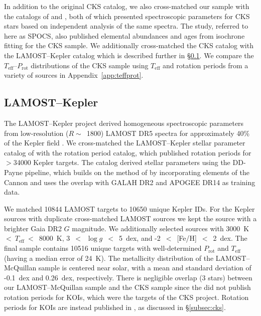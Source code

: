 \documentclass[linenumbers,tighten,trackchanges,twocolumn]{aastex631}
\newcommand{\teff}{\ensuremath{T_{\mathrm{eff}}}\xspace}
\newcommand{\logg}{\ensuremath{\log g}\xspace}
\newcommand{\prot}{\ensuremath{P_\mathrm{rot}}\xspace}
\begin{document}
In addition to the original CKS catalog, we also cross-matched our sample with the catalogs of \citet{Brewer2018} and \citet{Martinez2019}, both of which presented spectroscopic parameters for CKS stars based on independent analysis of the same spectra. The \citet{Brewer2018} study, referred to here as SPOCS, also published elemental abundances and ages from isochrone fitting for the CKS sample. We additionally cross-matched the CKS catalog with the LAMOST--Kepler catalog \citep{Xiang2019} which is described further in \S\ref{subsec:lamost}. We compare the \teff--\prot distributions of the CKS sample using \teff and rotation periods from a variety of sources in Appendix~\ref{app:teffprot}.

\subsection{LAMOST--Kepler} \label{subsec:lamost}
The LAMOST--Kepler project derived homogeneous spectroscopic parameters from low-resolution ($R\sim$~1800) LAMOST DR5 spectra for approximately 40\% of the Kepler field \citep{Zong2018, Xiang2019}. We cross-matched the LAMOST--Kepler stellar parameter catalog of \citet{Xiang2019} with the \citet{McQuillan2014} rotation period catalog, which published rotation periods for $>$34000 Kepler targets. The \citet{Xiang2019} catalog derived stellar parameters using the DD-Payne pipeline, which builds on the method of \citet{Ting2017b} by incorporating elements of the Cannon \citep{Ness2015} and uses the overlap with GALAH DR2 and APOGEE DR14 as training data. 

We matched 10844 LAMOST targets to 10650 unique Kepler IDs. For the Kepler sources with duplicate cross-matched LAMOST sources we kept the source with a brighter Gaia DR2 $G$ magnitude. We additionally selected sources with 3000~K~$<~\teff~<$~8000~K, 3~$<$~\logg~$<$~5~dex, and -2~$<$~[Fe/H]~$<$~2~dex. The final sample contains 10516 unique targets with well-determined \prot and \teff (having a median error of 24~K). The metallicity distribution of the LAMOST--McQuillan sample is centered near solar, with a mean and standard deviation of -0.1~dex and 0.26~dex, respectively. There is negligible overlap (3 stars) between our LAMOST--McQuillan sample and the CKS sample since the \citet{McQuillan2014} did not publish rotation periods for KOIs, which were the targets of the CKS project. Rotation periods for KOIs are instead published in \citet{McQuillan2013}, as discussed in \S\ref{subsec:cks}. 
\end{document}
